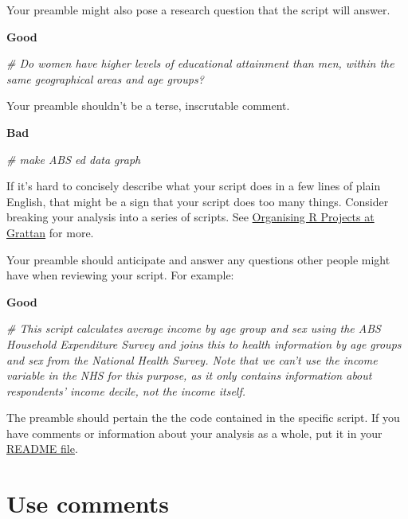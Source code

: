 \documentclass[]{book}
\newenvironment{Shaded}{\begin{snugshade}}{\end{snugshade}}
\newcommand{\CommentTok}[1]{\textcolor[rgb]{0.56,0.35,0.01}{\textit{#1}}}
\begin{document}
Your preamble might also pose a research question that the script will answer.

\textbf{Good}

\begin{Shaded}
\begin{Highlighting}[]
\CommentTok{# Do women have higher levels of educational attainment than men, within the same geographical areas and age groups?}
\end{Highlighting}
\end{Shaded}

Your preamble shouldn't be a terse, inscrutable comment.

\textbf{Bad}

\begin{Shaded}
\begin{Highlighting}[]
\CommentTok{# make ABS ed data graph}
\end{Highlighting}
\end{Shaded}

If it's hard to concisely describe what your script does in a few lines of plain English, that might be a sign that your script does too many things. Consider breaking your analysis into a series of scripts. See \protect\hyperlink{organising-projects}{Organising R Projects at Grattan} for more.

Your preamble should anticipate and answer any questions other people might have when reviewing your script. For example:

\textbf{Good}

\begin{Shaded}
\begin{Highlighting}[]
\CommentTok{# This script calculates average income by age group and sex using the ABS Household Expenditure Survey and joins this to health information by age groups and sex from the National Health Survey. Note that we can't use the income variable in the NHS for this purpose, as it only contains information about respondents' income decile, not the income itself.}
\end{Highlighting}
\end{Shaded}

The preamble should pertain the the code contained in the specific script. If you have comments or information about your analysis as a whole, put it in your \protect\hyperlink{README}{README file}.

\hypertarget{use-comments}{%
\section{Use comments}\label{use-comments}}
\end{document}
